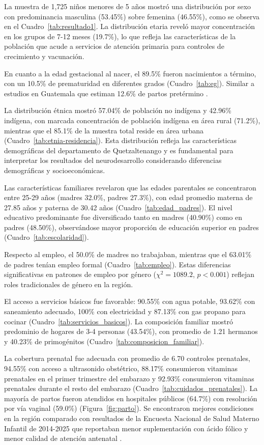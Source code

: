 \documentclass[11pt,letterpaper]{report}
\begin{document}
La muestra de 1,725 niños menores de 5 años mostró una distribución por sexo 
con predominancia masculina (53.45\%) sobre femenina (46.55\%), como se 
observa en el Cuadro~\ref{tab:resultado1}. La distribución etaria reveló mayor 
concentración en los grupos de 7-12 meses (19.7\%), lo que refleja las
características de la población que acude a servicios de 
atención primaria para controles de crecimiento y vacunación. 

En cuanto a la edad gestacional al nacer, el 89.5\% fueron nacimientos a 
término, con un 10.5\% de prematuridad en diferentes grados 
(Cuadro~\ref{tab:eg}). Similar a estudios en Guatemala que estiman 12.6\% de partos pretérmino \cite{Pusdekar2020}.

La distribución étnica mostró 57.04\% de población no indígena y 42.96\% 
indígena, con marcada concentración de población indígena en área rural 
(71.2\%), mientras que el 85.1\% de la muestra total reside en área urbana 
(Cuadro~\ref{tab:etnia-residencia}). Esta distribución refleja las 
características demográficas del departamento de Quetzaltenango y es 
fundamental para interpretar los resultados del neurodesarrollo considerando 
diferencias demográficas y socioeconómicas.

Las características familiares revelaron que las edades parentales se 
concentraron entre 25-29 años (madres 32.0\%, padres 27.3\%), con edad 
promedio materna de 27.85 años y paterna de 30.42 años 
(Cuadro~\ref{tab:edad_padres}). El nivel educativo predominante fue 
diversificado tanto en madres (40.90\%) como en padres (48.50\%), 
observándose mayor proporción de educación superior en padres 
(Cuadro~\ref{tab:escolaridad}).

Respecto al empleo, el 50.0\% de madres no trabajaban, mientras que el 63.01\% 
de padres tenían empleo formal (Cuadro~\ref{tab:empleo}). Estas diferencias 
significativas en patrones de empleo por género ($\chi^2 = 1089.2$, 
$p < 0.001$) reflejan roles tradicionales de género en la región.

El acceso a servicios básicos fue favorable: 90.55\% con agua potable, 93.62\% 
con saneamiento adecuado, 100\% con electricidad y 87.13\% con gas propano 
para cocinar (Cuadro~\ref{tab:servicios_basicos}). La composición familiar 
mostró predominio de hogares de 3-4 personas (43.54\%), con promedio de 1.21 
hermanos y 40.23\% de primogénitos (Cuadro~\ref{tab:composicion_familiar}).

La cobertura prenatal fue adecuada con promedio de 6.70 controles prenatales, 
94.55\% con acceso a ultrasonido obstétrico, 88.17\% consumieron vitaminas
prenatales en el primer trimestre del embarazo y 92.93\% consumieron vitaminas
prenatales durante el resto del embarazo (Cuadro~\ref{tab:cuidados_prenatales}). 
La mayoría de partos fueron atendidos en hospitales públicos (64.7\%) con 
resolución por vía vaginal (59.0\%) (Figura~\ref{fig:parto}). Se encontraron mejores condiciones en la región comparado con resultados de la Encuesta Nacional de Salud Materno Infantil de 2014-2025 que reportaban menor suplementación con ácido fólico y menor calidad de atención antenatal \cite{Santos2025}.
\end{document}
